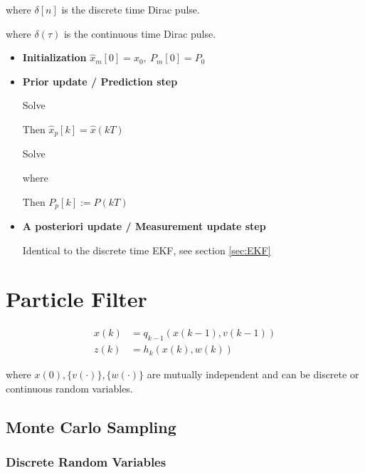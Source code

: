 \documentclass[10pt,a4paper]{scrartcl}
\begin{document}
\begin{multicols*}{2}
\begin{multicols*}{3}
where $\delta[n]$ is the discrete time Dirac pulse.


where $\delta(\tau)$ is the continuous time Dirac pulse.

\begin{itemize}
\item \textbf{Initialization} $\hat{x}_m[0]=x_0,\ P_m[0]=P_0$
\item \textbf{Prior update / Prediction step}

Solve


Then $\hat{x}_p[k]=\hat{x}(kT)$

Solve


where


Then $P_p[k]:=P(kT)$
\item \textbf{A posteriori update / Measurement update step}

Identical to the discrete time EKF, see section \ref{sec:EKF}
\end{itemize}

\section{Particle Filter}

\begin{align*}
x(k)&=q_{k-1}(x(k-1),v(k-1))\\
z(k)&=h_k(x(k),w(k))
\end{align*}

where $x(0),\{v(\cdot)\},\{w(\cdot)\}$ are mutually independent and can be discrete or continuous random variables.

\subsection{Monte Carlo Sampling}

\subsubsection{Discrete Random Variables}


\end{multicols*}
\end{multicols*}
\end{document}
